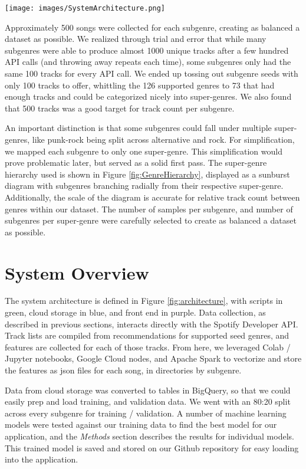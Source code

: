 \documentclass[conference]{IEEEtran}
\begin{document}
\begin{figure*}
  \texttt{[image: images/SystemArchitecture.png]}
  \caption{System architecture}
  \label{fig:architecture}
\end{figure*}

Approximately 500 songs were collected for each subgenre, creating as balanced a dataset as possible. We realized through trial and error that while many subgenres were able to produce almost 1000 unique tracks after a few hundred API calls (and throwing away repeats each time), some subgenres only had the same 100 tracks for every API call. We ended up tossing out subgenre seeds with only 100 tracks to offer, whittling the 126 supported genres to 73 that had enough tracks and could be categorized nicely into super-genres. We also found that 500 tracks was a good target for track count per subgenre.

An important distinction is that some subgenres could fall under multiple super-genres, like punk-rock being split across alternative and rock. For simplification, we mapped each subgenre to only one super-genre. This simplification would prove problematic later, but served as a solid first pass. The super-genre hierarchy used is shown in Figure \ref{fig:GenreHierarchy}, displayed as a sunburst diagram with subgenres branching radially from their respective super-genre. Additionally, the scale of the diagram is accurate for relative track count between genres within our dataset. The number of samples per subgenre, and number of subgenres per super-genre were carefully selected to create as balanced a dataset as possible.

\section{System Overview}
The system architecture is defined in Figure \ref{fig:architecture}, with scripts in green, cloud storage in blue, and front end in purple. Data collection, as described in previous sections, interacts directly with the Spotify Developer API. Track lists are compiled from recommendations for supported seed genres, and features are collected for each of those tracks. From here, we leveraged Colab / Jupyter notebooks, Google Cloud nodes, and Apache Spark to vectorize and store the features as json files for each song, in directories by subgenre. 

Data from cloud storage was converted to tables in BigQuery, so that we could easily prep and load training, and validation data. We went with an 80:20 split across every subgenre for training / validation. A number of machine learning models were tested against our training data to find the best model for our application, and the \emph{Methods} section describes the results for individual models. This trained model is saved and stored on our Github repository for easy loading into the application.
\end{document}
